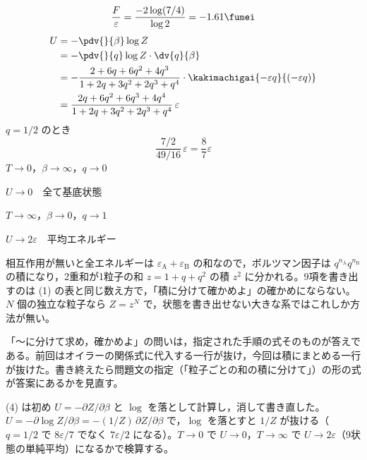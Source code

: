 \[ \frac{F}{\varepsilon}=\frac{-2\log(7/4)}{\log2}=-1.61\fumei \]
\begin{align*}
U&=-\pdv{}{\beta}\log Z\\
&=-\pdv{}{q}\log Z\cdot\dv{q}{\beta}\\
&=-\frac{2+6q+6q^{2}+4q^{3}}{1+2q+3q^{2}+2q^{3}+q^{4}}\cdot\kakimachigai{-\varepsilon q}{(-\varepsilon q)}\\
&=\frac{2q+6q^{2}+6q^{3}+4q^{4}}{1+2q+3q^{2}+2q^{3}+q^{4}}\,\varepsilon
\end{align*}
$q=1/2$ のとき
\[ \frac{7/2}{49/16}\,\varepsilon=\frac{8}{7}\varepsilon \]
$T\to0$，$\beta\to\infty$，$q\to0$

$U\to0$　全て基底状態

$T\to\infty$，$\beta\to0$，$q\to1$

$U\to2\varepsilon$　平均エネルギー
\item 相互作用が無いと全エネルギーは $\varepsilon_{\mathrm{A}}+\varepsilon_{\mathrm{B}}$ の和なので，ボルツマン因子は $q^{n_{\mathrm{A}}}q^{n_{\mathrm{B}}}$ の積になり，2重和が1粒子の和 $z=1+q+q^{2}$ の積 $z^{2}$ に分かれる。9項を書き出すのは (1) の表と同じ数え方で，「積に分けて確かめよ」の確かめにならない。$N$ 個の独立な粒子なら $Z=z^{N}$ で，状態を書き出せない大きな系ではこれしか方法が無い。
\item {} 「〜に分けて求め，確かめよ」の問いは，指定された手順の式そのものが答えである。前回はオイラーの関係式に代入する一行が抜け，今回は積にまとめる一行が抜けた。書き終えたら問題文の指定（「粒子ごとの和の積に分けて」）の形の式が答案にあるかを見直す。
\item (4) は初め $U=-\partial Z/\partial\beta$ と $\log$ を落として計算し，消して書き直した。$U=-\partial\log Z/\partial\beta=-(1/Z)\,\partial Z/\partial\beta$ で，$\log$ を落とすと $1/Z$ が抜ける（$q=1/2$ で $8\varepsilon/7$ でなく $7\varepsilon/2$ になる）。$T\to0$ で $U\to0$，$T\to\infty$ で $U\to2\varepsilon$（9状態の単純平均）になるかで検算する。
